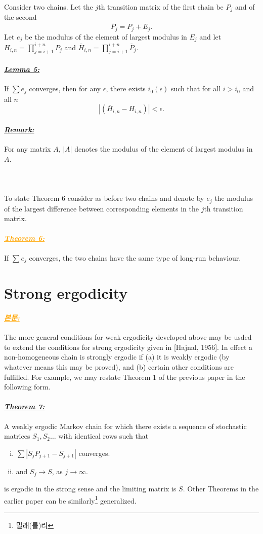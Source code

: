 \documentclass[12pt,oneside,english,a4paper]{article}
\def\bk{\paragraph{\LARGE$$}\LARGE}
\newcommand{\para}[1]{\paragraph{\LARGE\it\underline{\textbf{#1:}}}\LARGE}
\newcommand{\paraorange}[1]{\paragraph{\LARGE\textcolor{orange}{\it\underline{\textbf{#1:}}}}\LARGE}
\begin{document}
Consider two chains. Let the $j$th transition matrix of the first chain be $P_j$ and of the second 
\[
\bar{P}_j=P_j+E_j.
\]
Let $e_j$ be the modulus of the element of largest modulus in $E_j$ and let $H_{i,n}=\prod_{j=i+1}^{i+n}P_j$ and $\bar{H}_{i,n}=\prod_{j=i+1}^{i+n}\bar{P}_j$.

\para{Lemma 5} If $\sum e_j$ converges, then for any $\epsilon$, there exists $i_0(\epsilon)$ such that for all $i>i_0$ and all $n$ 
\[
\left|(\bar{H}_{i,n}-H_{i,n}) \right|<\epsilon.
\]
\para{Remark} For any matrix $A$, $|A|$ denotes the modulus of the element of largest modulus in $A$. 

\bk To state Theorem 6 consider as before two chains and denote by $e_j$ the modulus of the largest difference between corresponding elements in the $j$th transition matrix. 

\paraorange{Theorem 6} If $\sum e_j$ converges, the two chains have the same type of long-run behaviour. 

\section{Strong ergodicity} 

\paraorange{본문} The more general conditions for weak ergodicity developed above may be usded to extend the conditions for strong ergodicity given in [Hajnal, 1956]. In effect a non-homogeneous chain is strongly ergodic if (a) it is weakly ergodic (by whatever means this may be proved), and (b) certain other conditions are fulfilled. For example, we may restate Theorem 1 of the previous paper in the following form. 
\para{Theorem 7} A weakly ergodic Markov chain for which there exists a sequence of stochastic matrices $S_1,S_2\dots$ with identical rows such that 
\begin{enumerate}[(i)]
\item $\sum|S_jP_{j+1}-S_{j+1}|$ converges. 
\item and $S_j\to S$, as $j\to\infty$.
\end{enumerate}
is ergodic in the strong sense and the limiting matrix is $S$. Other Theorems in the earlier paper can be similarly\footnote{{}밀래(를)리} generalized. 
\end{document}
